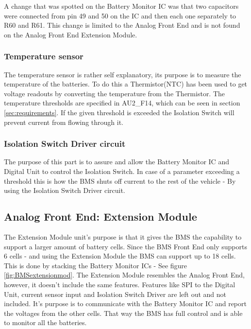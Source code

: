 A change that was spotted on the Battery Monitor IC was that two capacitors were connected from pin 49 and 50 on the IC and then each one separately to R60 and R61. This change is limited to the Analog Front End and is not found on the Analog Front End Extension Module.

\subsubsection{Temperature sensor}
The temperature sensor is rather self explanatory, its purpose is to measure the temperature of the batteries. To do this a Thermistor(NTC) has been used to get voltage readouts by converting the temperature from the Thermistor. The temperature thresholds are specified in AU2\_F14, which can be seen in section \vref{sec:requirements}. If the given threshold is exceeded the Isolation Switch will prevent current from flowing through it.

\subsubsection{Isolation Switch Driver circuit}
The purpose of this part is to assure and allow the Battery Monitor IC and Digital Unit to control the Isolation Switch. In case of a parameter exceeding a threshold this is how the BMS shuts off current to the rest of the vehicle - By using the Isolation Switch Driver circuit.

\subsection{Analog Front End: Extension Module}
The Extension Module unit's purpose is that it gives the BMS the capability to support a larger amount of battery cells. Since the BMS Front End only supports 6 cells - and using the Extension Module the BMS can support up to 18 cells. This is done by stacking the Battery Monitor ICs - See figure \vref{fig:BMSextensionmod}. The Extension Module resembles the Analog Front End, however, it doesn't include the same features. Features like SPI to the Digital Unit, current sensor input and Isolation Switch Driver are left out and not included. It's purpose is to communicate with the Battery Monitor IC and report the voltages from the other cells. That way the BMS has full control and is able to monitor all the batteries.\\


